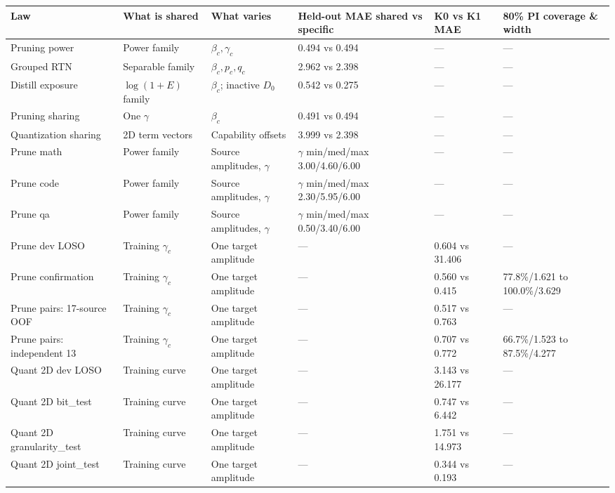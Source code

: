 \begin{table}[H]
\centering\footnotesize\setlength{\tabcolsep}{3pt}
\begin{tabular}{@{}p{1.9cm}p{1.9cm}p{2.0cm}p{2.5cm}p{2.1cm}p{2.5cm}@{}}
\toprule
Law & What is shared & What varies & Held-out MAE shared vs specific & K0 vs K1 MAE & 80\% PI coverage \& width \\
\midrule
Pruning power & Power family & $\beta_c,\gamma_c$ & 0.494 vs 0.494 & --- & --- \\
Grouped RTN & Separable family & $\beta_c,p_c,q_c$ & 2.962 vs 2.398 & --- & --- \\
Distill exposure & $\log(1+E)$ family & $\beta_c$; inactive $D_0$ & 0.542 vs 0.275 & --- & --- \\
Pruning sharing & One $\gamma$ & $\beta_c$ & 0.491 vs 0.494 & --- & --- \\
Quantization sharing & 2D term vectors & Capability offsets & 3.999 vs 2.398 & --- & --- \\
Prune math & Power family & Source amplitudes, $\gamma$ & $\gamma$ min/med/max 3.00/4.60/6.00 & --- & --- \\
Prune code & Power family & Source amplitudes, $\gamma$ & $\gamma$ min/med/max 2.30/5.95/6.00 & --- & --- \\
Prune qa & Power family & Source amplitudes, $\gamma$ & $\gamma$ min/med/max 0.50/3.40/6.00 & --- & --- \\
\midrule
Prune dev LOSO & Training $\gamma_c$ & One target amplitude & --- & 0.604 vs 31.406 & --- \\
Prune confirmation & Training $\gamma_c$ & One target amplitude & --- & 0.560 vs 0.415 & 77.8\%/1.621 to 100.0\%/3.629 \\
Prune pairs: 17-source OOF & Training $\gamma_c$ & One target amplitude & --- & 0.517 vs 0.763 & --- \\
Prune pairs: independent 13 & Training $\gamma_c$ & One target amplitude & --- & 0.707 vs 0.772 & 66.7\%/1.523 to 87.5\%/4.277 \\
Quant 2D dev LOSO & Training curve & One target amplitude & --- & 3.143 vs 26.177 & --- \\
Quant 2D bit\_test & Training curve & One target amplitude & --- & 0.747 vs 6.442 & --- \\
Quant 2D granularity\_test & Training curve & One target amplitude & --- & 1.751 vs 14.973 & --- \\
Quant 2D joint\_test & Training curve & One target amplitude & --- & 0.344 vs 0.193 & --- \\

\end{tabular}
\end{table}
